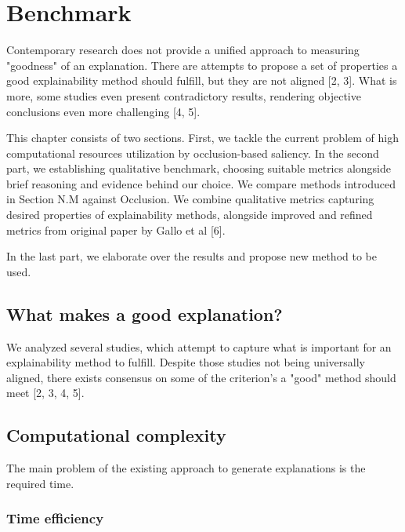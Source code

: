 \chapter{Benchmark}

Contemporary research does not provide a unified approach to measuring "goodness" of an explanation. There are attempts to propose a set of properties a good explainability method should fulfill, but they are not aligned [2, 3]. What is more, some studies even present contradictory results, rendering objective conclusions even more challenging [4, 5].

This chapter consists of two sections. First, we tackle the current problem of high computational resources utilization by occlusion-based saliency. In the second part, we establishing qualitative benchmark, choosing suitable metrics alongside brief reasoning and evidence behind our choice. We compare methods introduced in Section N.M against Occlusion. We combine qualitative metrics capturing desired properties of explainability methods, alongside improved and refined metrics from original paper by Gallo et al [6].

In the last part, we elaborate over the results and propose new method to be used.

\section{What makes a good explanation?}

We analyzed several studies, which attempt to capture what is important for an explainability method to fulfill. Despite those studies not being universally aligned, there exists consensus on some of the criterion's a "good" method should meet [2, 3, 4, 5]. 


\section{Computational complexity}

The main problem of the existing approach to generate explanations is the required time.

\subsection{Time efficiency}

